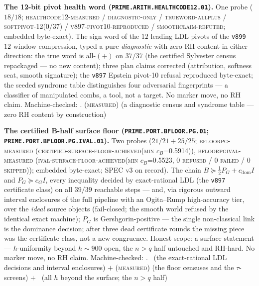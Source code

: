 \documentclass[11pt,a4paper]{article}
\theoremstyle{definition}
\begin{document}
\par\smallskip\noindent\textbf{The 12-bit pivot health word
(\texttt{PRIME.ARITH.\allowbreak HEALTHCODE12.01}).}
One probe ($18/18$; \textsc{healthcode12-measured /
diagnostic-only / trueword-allplus / softpivot-12(0/37) /
v897-pivot10-reproduced / smoothclaim-refuted}; embedded
byte-exact).  The sign word of the $12$ leading LDL pivots of
the \texttt{v899} $12$-window compression, typed a pure
\emph{diagnostic} with zero RH content in either direction: the
true word is all-$(+)$ on $37/37$ (the certified Sylvester
census repackaged --- no new content); three plan claims
corrected (attribution, softness seat, smooth signature); the
\texttt{v897} Epstein pivot-10 refusal reproduced byte-exact;
the seeded syndrome table distinguishes four adversarial
fingerprints --- a classifier of manipulated combs, a tool, not
a target.  No marker move, no RH claim.
Machine-checked: .
(\textsc{measured}) (a diagnostic census and syndrome table ---
zero RH content by construction)
\par\smallskip

\par\smallskip\noindent\textbf{The certified B-half surface
floor (\texttt{PRIME.PORT.BFLOOR.\allowbreak PG.01};
\texttt{PRIME.PORT.BFLOOR.PG.\allowbreak IVAL.01}).}
Two probes ($21/21 + 25/25$; \textsc{bfloorpg-measured
(certified-surface-floor-achieved(min $c_B$=0.5914))},
\textsc{bfloorpgival-measured
(ival-surface-floor-achieved(min $c_B$=0.5523, 0 refused / 0
failed / 0 skipped))}; embedded byte-exact; SPEC v3 on record).
The chain $B \succeq \tfrac12 P_G + c_{\mathrm{dom}} I$ and
$P_G \succeq c_G I$, every inequality decided by exact-rational
LDL (the \texttt{v897} certificate class) on all $39/39$
reachable steps --- and, via rigorous outward interval
enclosures of the full pipeline with an Ogita--Rump
high-accuracy tier, over the \emph{ideal} source objects
(fail-closed; the smooth world refused by the identical exact
machine); $P_G$ is Gershgorin-positive --- the single
non-classical link is the dominance decision; after three dead
certificate rounds the missing piece was the certificate class,
not a new congruence.  Honest scope: a surface statement ---
$h$-uniformity beyond $h \sim 900$ open, the $n > q$ half
untouched and RH-hard.  No marker move, no RH claim.
Machine-checked: .
\mE\ (the exact-rational LDL decisions and interval enclosures)
$+$ (\textsc{measured}) (the floor censuses and the
$\tau$-screens) $+$ \mO\ (all $h$ beyond the surface; the
$n > q$ half)
\par\smallskip
\end{document}
